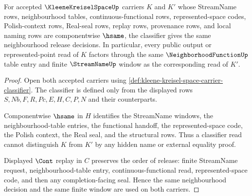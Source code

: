 \begin{theorem}
\label{thm:kleene-kreisel-space-neighborhood-stability}
For accepted $\KleeneKreiselSpaceUp$ carriers $K$ and $K'$ whose StreamName rows, neighbourhood tables, continuous-functional rows, represented-space codes, Polish-context rows, Real-seal rows, replay rows, provenance rows, and local naming rows are componentwise $\hsame$, the classifier gives the same neighbourhood release decisions. In particular, every public output or represented-point read of $K$ factors through the same $\NeighborhoodFunctionUp$ table entry and finite $\StreamNameUp$ window as the corresponding read of $K'$.
\end{theorem}
\begin{proof}
Open both accepted carriers using \autoref{def:kleene-kreisel-space-carrier-classifier}. The classifier is defined only from the displayed rows $S,Nb,F,R,Pc,E,H,C,P,N$ and their counterparts.

Componentwise $\hsame$ in $H$ identifies the StreamName windows, the neighbourhood-table entries, the functional handoff, the represented-space code, the Polish context, the Real seal, and the structural rows. Thus a classifier read cannot distinguish $K$ from $K'$ by any hidden name or external equality proof.

Displayed $\Cont$ replay in $C$ preserves the order of release: finite StreamName request, neighbourhood-table entry, continuous-functional read, represented-space code, and then any completion-facing seal. Hence the same neighbourhood decision and the same finite window are used on both carriers.
\end{proof}

